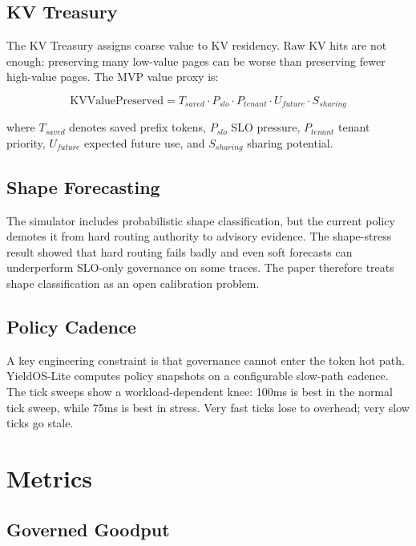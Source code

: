 \documentclass[11pt]{article}
\begin{document}
\subsection{KV Treasury}

The KV Treasury assigns coarse value to KV residency. Raw KV hits are not enough: preserving many low-value pages can be worse than preserving fewer high-value pages. The MVP value proxy is:

\begin{equation}
\mathrm{KVValuePreserved} = T_{saved} \cdot P_{slo} \cdot P_{tenant} \cdot U_{future} \cdot S_{sharing}
\end{equation}

where $T_{saved}$ denotes saved prefix tokens, $P_{slo}$ SLO pressure, $P_{tenant}$ tenant priority, $U_{future}$ expected future use, and $S_{sharing}$ sharing potential.

\subsection{Shape Forecasting}

The simulator includes probabilistic shape classification, but the current policy demotes it from hard routing authority to advisory evidence. The shape-stress result showed that hard routing fails badly and even soft forecasts can underperform SLO-only governance on some traces. The paper therefore treats shape classification as an open calibration problem.

\subsection{Policy Cadence}

A key engineering constraint is that governance cannot enter the token hot path. YieldOS-Lite computes policy snapshots on a configurable slow-path cadence. The tick sweeps show a workload-dependent knee: 100ms is best in the normal tick sweep, while 75ms is best in stress. Very fast ticks lose to overhead; very slow ticks go stale.

\section{Metrics}

\subsection{Governed Goodput}
\end{document}

